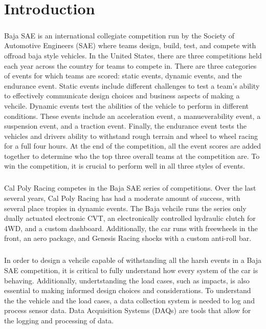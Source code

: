 \chapter{Introduction}

\paragraph{}
Baja SAE is an international collegiate competition run by the Society of Automotive Engineers (SAE) where teams design, build, test, and compete with offroad baja style vehicles.
In the United States, there are three competitions held each year across the country for teams to compete in. 
There are three categories of events for which teams are scored: static events, dynamic events, and the endurance event.  
Static events include different challenges to test a team's ability to effectively communicate design choices and business aspects of making a vehcile.  
Dynamic events test the abilities of the vehicle to perform in different conditions.  
These events include an acceleration event, a manueverability event, a suspension event, and a traction event.  
Finally, the endurance event tests the vehicles and drivers ability to withstand rough terrain and wheel to wheel racing for a full four hours.
At the end of the competition, all the event scores are added together to determine who the top three overall teams at the competition are.
To win the competition, it is crucial to perform well in all three styles of events.

\paragraph{}
Cal Poly Racing competes in the Baja SAE series of competitions.
Over the last several years, Cal Poly Racing has had a moderate amount of success, with several place tropies in dynamic events.
The Baja vehcile runs the series only dually actuated electronic CVT, an electronically controlled hydraulic clutch for 4WD, and a custom dashboard.
Additionally, the car runs with freewheels in the front, an aero package, and Genesis Racing shocks with a custom anti-roll bar.

\paragraph{}
In order to design a vehcile capable of withstanding all the harsh events in a Baja SAE competition, it is critical to fully understand how every system of the car is behaving.
Additionally, undertstanding the load cases, such as impacts, is also essential to making informed design choices and considerations.
To understand the the vehicle and the load cases, a data collection system is needed to log and process sensor data.
Data Acquisition Systems (DAQs) are tools that allow for the logging and processing of data.

\paragraph{}

